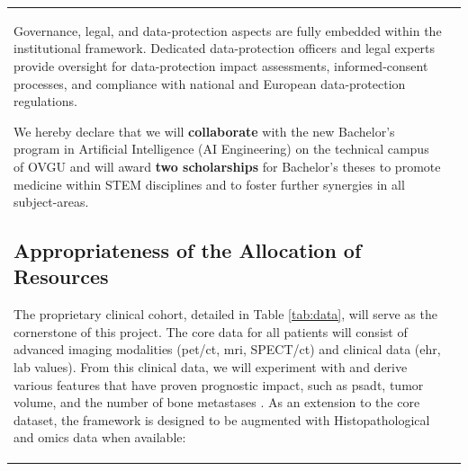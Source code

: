 \documentclass[11pt, a4paper]{article}
\begin{document}
\begin{longtable}{| p{} | p{} |}
Governance, legal, and data-protection aspects are fully embedded within the institutional framework. Dedicated data-protection officers and legal experts provide oversight for data-protection impact assessments, informed-consent processes, and compliance with national and European data-protection regulations.
 
We hereby declare that we will \textbf{collaborate} with the new Bachelor’s program in Artificial Intelligence (AI Engineering) on the technical campus of OVGU and will award \textbf{two scholarships} for Bachelor’s theses to promote medicine within STEM disciplines and to foster further synergies in all subject-areas. 

\subsection{Appropriateness of the Allocation of Resources}
The proprietary clinical cohort, detailed in Table \ref{tab:data}, will serve as the cornerstone of this project. The core data for all patients will consist of advanced imaging modalities (\gls{pet}/\gls{ct}, \gls{mri}, SPECT/\gls{ct}) and clinical data (\gls{ehr}, lab values). From this clinical data, we will experiment with and derive various features that have proven prognostic impact, such as \gls{psadt}, tumor volume, and the number of bone metastases \cite{guidelines_uro_1,guidelines_uro_2}. As an extension to the core dataset, the framework is designed to be augmented with Histopathological and omics data when available:



\end{longtable}
\end{document}
